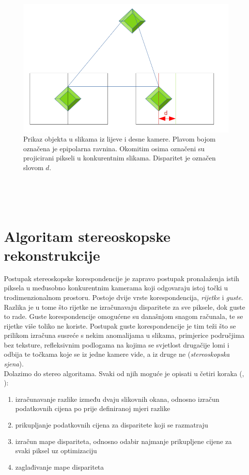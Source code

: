 \documentclass[times, utf8, zavrsni, numeric]{fer}
\begin{document}
\begin{figure}[htb]
\centering
\includegraphics[width = 14.5cm]{img/slika4.png}
\caption{Prikaz objekta u slikama iz lijeve i desne kamere. Plavom bojom označena je epipolarna ravnina. Okomitim osima označeni su projicirani pikseli u konkurentnim slikama. Disparitet je označen slovom $d$.}
\label{fig:Disparitet i epipolar}
\end{figure}\\
\\\\
\section{Algoritam stereoskopske rekonstrukcije}
Postupak stereoskopske korespondencije je zapravo postupak pronalaženja istih piksela u međusobno konkurentnim kamerama koji odgovaraju istoj točki u trodimenzionalnom prostoru. Postoje dvije vrste korespondencija, \textit{rijetke} i \textit{guste}. Razlika je u tome što rijetke ne izračunavaju disparitete za sve piksele, dok guste to rade. Guste korespondencije omogućene su današnjom snagom računala, te se rijetke više toliko ne koriste. Postupak guste korespondencije je tim teži što se prilikom izračuna susreće s nekim anomalijama u slikama, primjerice područjima bez teksture, refleksivnim podlogama na kojima se svjetlost drugačije lomi i odbija te točkama koje se iz jedne kamere vide, a iz druge ne (\textit{stereoskopska sjena}).\\
Dolazimo do stereo algoritama. Svaki od njih moguće je opisati u četiri koraka (\citep{scharszelinski}, \citep{kovac2015stereo}):
\begin{enumerate}
\item izračunavanje razlike između dvaju slikovnih okana, odnosno izračun podatkovnih cijena po prije definiranoj mjeri razlike
\item prikupljanje podatkovnih cijena za disparitete koji se razmatraju
\item izračun mape dispariteta, odnosno odabir najmanje prikupljene cijene za svaki piksel uz optimizaciju
\item zaglađivanje mape dispariteta 
\end{enumerate}
\end{document}
